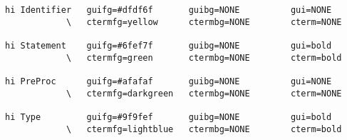 \begin{framed}
\begin{verbatim}
hi Identifier   guifg=#dfdf6f       guibg=NONE          gui=NONE
            \   ctermfg=yellow      ctermbg=NONE        cterm=NONE

hi Statement    guifg=#6fef7f       guibg=NONE          gui=bold
            \   ctermfg=green       ctermbg=NONE        cterm=bold

hi PreProc      guifg=#afafaf       guibg=NONE          gui=NONE
            \   ctermfg=darkgreen   ctermbg=NONE        cterm=NONE

hi Type         guifg=#9f9fef       guibg=NONE          gui=bold
            \   ctermfg=lightblue   ctermbg=NONE        cterm=bold

\end{verbatim}
 \end{framed}